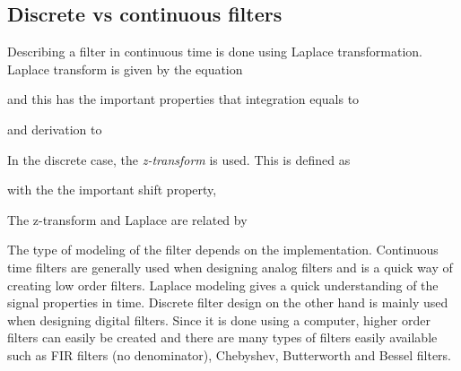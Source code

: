 \subsection*{Discrete vs continuous filters}
Describing a filter in continuous time is done using Laplace transformation.
Laplace transform is given by the equation

and this has the important properties that integration equals to 

and derivation to

In the discrete case, the \textit{z-transform} is used. This is defined as

with the the important shift property, 

The z-transform and Laplace are related by

The type of modeling of the filter depends on the implementation. Continuous
time filters are generally used when designing analog filters and is a quick way
of creating low order filters. Laplace modeling gives a quick understanding of
the signal properties in time. 
\newline
Discrete filter design on the other hand is mainly used when designing digital
filters. Since it is done using a computer, higher order filters can easily be
created and there are many types of filters easily available such as FIR filters
(no denominator), Chebyshev, Butterworth and Bessel filters.


